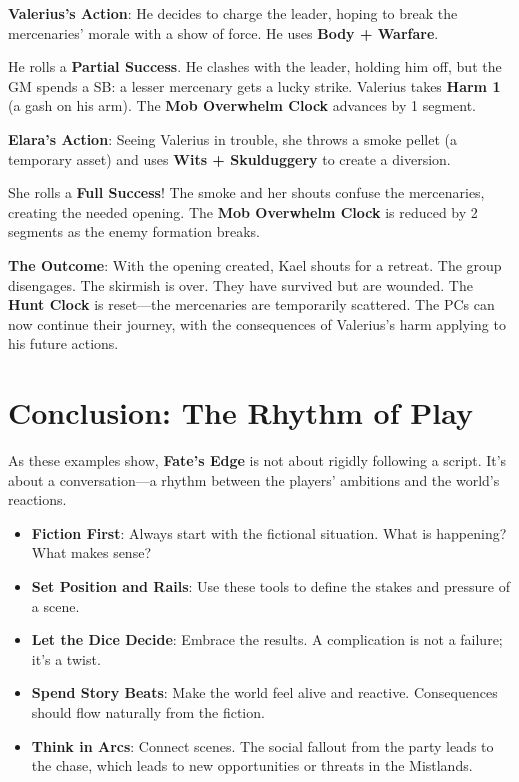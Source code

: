 \textbf{Valerius's Action}: He decides to charge the leader, hoping to break the mercenaries' morale with a show of force. He uses \textbf{Body + Warfare}.

He rolls a \textbf{Partial Success}. He clashes with the leader, holding him off, but the GM spends a SB: a lesser mercenary gets a lucky strike. Valerius takes \textbf{Harm 1} (a gash on his arm). The \textbf{Mob Overwhelm Clock} advances by 1 segment.

\textbf{Elara's Action}: Seeing Valerius in trouble, she throws a smoke pellet (a temporary asset) and uses \textbf{Wits + Skulduggery} to create a diversion.

She rolls a \textbf{Full Success}! The smoke and her shouts confuse the mercenaries, creating the needed opening. The \textbf{Mob Overwhelm Clock} is reduced by 2 segments as the enemy formation breaks.

\textbf{The Outcome}: With the opening created, Kael shouts for a retreat. The group disengages. The skirmish is over. They have survived but are wounded. The \textbf{Hunt Clock} is reset---the mercenaries are temporarily scattered. The PCs can now continue their journey, with the consequences of Valerius's harm applying to his future actions.

\section*{Conclusion: The Rhythm of Play}

As these examples show, \textbf{Fate's Edge} is not about rigidly following a script. It's about a conversation---a rhythm between the players' ambitions and the world's reactions.

\begin{tcolorbox}[title=The GM's Mantra, colback=green!5!white, colframe=green!75!black, fonttitle=\bfseries]
\begin{itemize}
    \item \textbf{Fiction First}: Always start with the fictional situation. What is happening? What makes sense?
    \item \textbf{Set Position and Rails}: Use these tools to define the stakes and pressure of a scene.
    \item \textbf{Let the Dice Decide}: Embrace the results. A complication is not a failure; it's a twist.
    \item \textbf{Spend Story Beats}: Make the world feel alive and reactive. Consequences should flow naturally from the fiction.
    \item \textbf{Think in Arcs}: Connect scenes. The social fallout from the party leads to the chase, which leads to new opportunities or threats in the Mistlands.
\end{itemize}
\end{tcolorbox}


